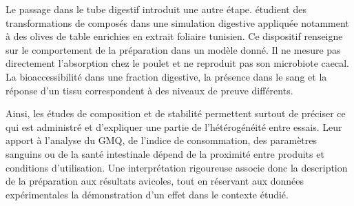 Le passage dans le tube digestif introduit une autre étape. \citet{Mechi2023} étudient des transformations de composés dans une simulation digestive appliquée notamment à des olives de table enrichies en extrait foliaire tunisien. Ce dispositif renseigne sur le comportement de la préparation dans un modèle donné. Il ne mesure pas directement l'absorption chez le poulet et ne reproduit pas son microbiote caecal. La bioaccessibilité dans une fraction digestive, la présence dans le sang et la réponse d'un tissu correspondent à des niveaux de preuve différents.

Ainsi, les études de composition et de stabilité permettent surtout de préciser ce qui est administré et d'expliquer une partie de l'hétérogénéité entre essais. Leur apport à l'analyse du GMQ, de l'indice de consommation, des paramètres sanguins ou de la santé intestinale dépend de la proximité entre produits et conditions d'utilisation. Une interprétation rigoureuse associe donc la description de la préparation aux résultats avicoles, tout en réservant aux données expérimentales la démonstration d'un effet dans le contexte étudié.
